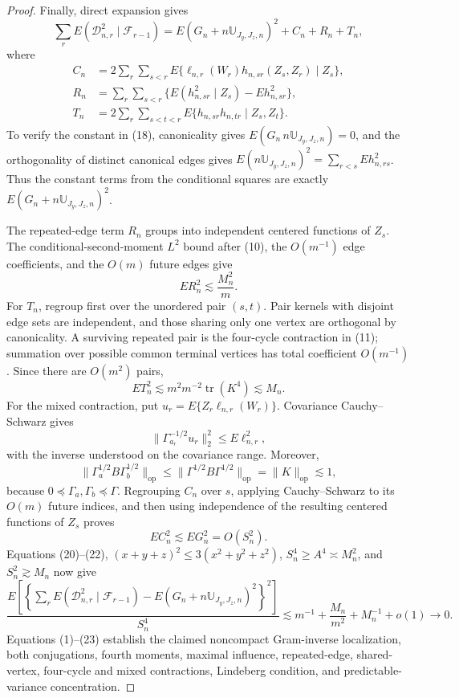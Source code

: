 \documentclass{article}
\begin{document}
\begin{proof}
Finally, direct expansion gives
\[
\sum_rE(\mathcal D_{n,r}^2\mid\mathcal F_{r-1})
=E(G_n+n\mathbb U_{J_y,J_z,n})^2+C_n+R_n+T_n, \tag{18}
\]
where
\[
\begin{split}
C_n&=2\sum_r\sum_{s<r}E\{\ell_{n,r}(W_r)h_{n,sr}(Z_s,Z_r)\mid Z_s\},\\
R_n&=\sum_r\sum_{s<r}\{E(h_{n,sr}^2\mid Z_s)-Eh_{n,sr}^2\},\\
T_n&=2\sum_r\sum_{s<t<r}E\{h_{n,sr}h_{n,tr}\mid Z_s,Z_t\}.
\end{split} \tag{19}
\]
To verify the constant in (18), canonicality gives \(E(G_n\,n\mathbb U_{J_y,J_z,n})=0\), and the orthogonality of distinct canonical edges gives \(E(n\mathbb U_{J_y,J_z,n})^2=\sum_{r<s}Eh_{n,rs}^2\). Thus the constant terms from the conditional squares are exactly \(E(G_n+n\mathbb U_{J_y,J_z,n})^2\).

The repeated-edge term \(R_n\) groups into independent centered functions of \(Z_s\). The conditional-second-moment \(L^2\) bound after (10), the \(O(m^{-1})\) edge coefficients, and the \(O(m)\) future edges give
\[
ER_n^2\lesssim\frac{M_n^2}{m}. \tag{20}
\]
For \(T_n\), regroup first over the unordered pair \((s,t)\). Pair kernels with disjoint edge sets are independent, and those sharing only one vertex are orthogonal by canonicality. A surviving repeated pair is the four-cycle contraction in (11); summation over possible common terminal vertices has total coefficient \(O(m^{-1})\). Since there are \(O(m^2)\) pairs,
\[
ET_n^2\lesssim m^2m^{-2}\operatorname{tr}(K^4)\lesssim M_n. \tag{21}
\]
For the mixed contraction, put \(u_r=E\{Z_r\ell_{n,r}(W_r)\}\). Covariance Cauchy--Schwarz gives
\[
\|\Gamma_{a_r}^{-1/2}u_r\|_2^2\le E\ell_{n,r}^2,
\]
with the inverse understood on the covariance range. Moreover,
\[
\|\Gamma_a^{1/2}B\Gamma_b^{1/2}\|_{\mathrm{op}}
\le\|\Gamma^{1/2}B\Gamma^{1/2}\|_{\mathrm{op}}
=\|K\|_{\mathrm{op}}\lesssim1,
\]
because \(0\preceq\Gamma_a,\Gamma_b\preceq\Gamma\). Regrouping \(C_n\) over \(s\), applying Cauchy--Schwarz to its \(O(m)\) future indices, and then using independence of the resulting centered functions of \(Z_s\) proves
\[
EC_n^2\lesssim EG_n^2=O(S_n^2). \tag{22}
\]
Equations (20)--(22), \((x+y+z)^2\le3(x^2+y^2+z^2)\), \(S_n^4\ge A^4\asymp M_n^2\), and \(S_n^2\gtrsim M_n\) now give
\[
\frac{E\left[\left\{\sum_rE(\mathcal D_{n,r}^2\mid\mathcal F_{r-1})
-E(G_n+n\mathbb U_{J_y,J_z,n})^2\right\}^2\right]}{S_n^4}
\lesssim m^{-1}+\frac{M_n}{m^2}+M_n^{-1}+o(1)\longrightarrow0. \tag{23}
\]
Equations (1)--(23) establish the claimed noncompact Gram-inverse localization, both conjugations, fourth moments, maximal influence, repeated-edge, shared-vertex, four-cycle and mixed contractions, Lindeberg condition, and predictable-variance concentration.
\end{proof}
\end{document}
